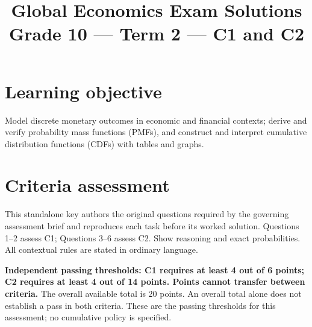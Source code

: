 \makeatletter
{}
\makeatother

\linespread{0.98}
\setlength{\parskip}{2pt}
\renewcommand{\arraystretch}{1.0}
\setlength{\emergencystretch}{2em}
\title{Global Economics Exam Solutions\\Grade 10 --- Term 2 --- C1 and C2}
\author{}
\date{}
\makeatletter
\renewcommand{\@maketitle}{\begin{center}{\Large\bfseries\@title\par}\end{center}}
\renewcommand\subsection{\@startsection{subsection}{2}{\z@}{-1.4ex plus -.3ex}{.7ex}{\normalfont\large\bfseries}}
\makeatother
{}

\maketitle
\small
\setcounter{tocdepth}{1}
\label{toc}
\tableofcontents
\section*{Learning objective}
Model discrete monetary outcomes in economic and financial contexts; derive and verify probability mass functions (PMFs), and construct and interpret cumulative distribution functions (CDFs) with tables and graphs.
\section*{Criteria assessment}
This standalone key authors the original questions required by the governing assessment brief and reproduces each task before its worked solution. Questions 1--2 assess C1; Questions 3--6 assess C2. Show reasoning and exact probabilities. All contextual rules are stated in ordinary language.

\textbf{Independent passing thresholds: C1 requires at least 4 out of 6 points; C2 requires at least 4 out of 14 points. Points cannot transfer between criteria.} The overall available total is 20 points. An overall total alone does not establish a pass in both criteria. These are the passing thresholds for this assessment; no cumulative policy is specified.
